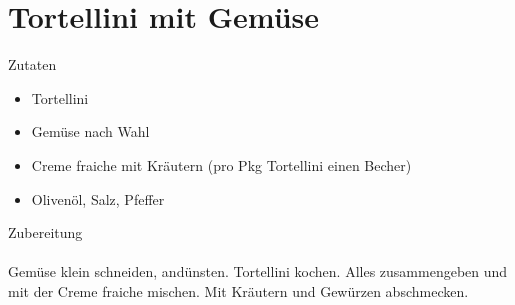 \section*{Tortellini mit Gemüse}
\ihead{}\ohead{}
\cfoot{}
{\Large Zutaten}
\begin{multicols}{2}
\begin{itemize}
    \item Tortellini
    \item Gemüse nach Wahl
    \item Creme fraiche mit Kräutern (pro Pkg Tortellini einen Becher)
    \item Olivenöl, Salz, Pfeffer
\end{itemize}
\end{multicols}
\noindent
{\Large Zubereitung}\\
\\
Gemüse klein schneiden, andünsten.
Tortellini kochen.
Alles zusammengeben und mit der Creme fraiche mischen.
Mit Kräutern und Gewürzen abschmecken.